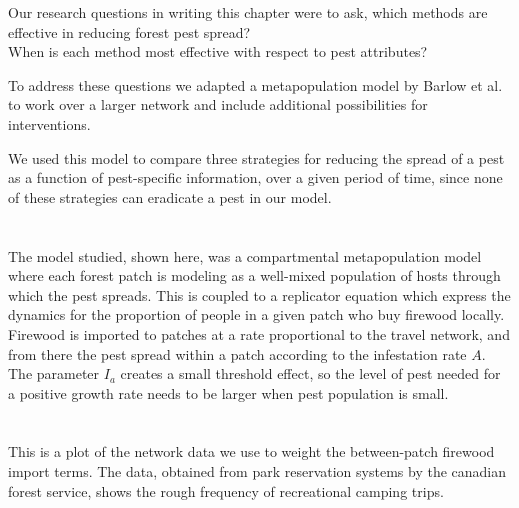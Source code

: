 \documentclass{article}
\begin{document}
Our research questions in writing this chapter were to ask, which methods are effective in reducing forest pest spread? \\
\vspace{0.5cm}
When is each method most effective with respect to pest attributes? 

To address these questions we adapted a metapopulation model by Barlow et al. to work over a larger network and include additional possibilities for interventions.

We used this model to compare three strategies for reducing the spread of a pest as a function of pest-specific information, over a given period of time, since none of these strategies can eradicate a pest in our model.


\section{}

The model studied, shown here, was a compartmental metapopulation model where each forest patch is modeling as a well-mixed population of hosts through which the pest spreads. This is coupled to a replicator equation which express the dynamics for the proportion of people in a given patch who buy firewood locally. Firewood is imported to patches at a rate proportional to the travel network, and from there the pest spread within a patch according to the infestation rate $A$. The parameter $I_a$ creates a small threshold effect, so the level of pest needed for a positive growth rate needs to be larger when pest population is small. 

\section{}

This is a plot of the network data we use to weight the between-patch firewood import terms. The data, obtained from park reservation systems by the canadian forest service, shows the rough frequency of recreational camping trips.

\section{}




\section{}
\end{document}
